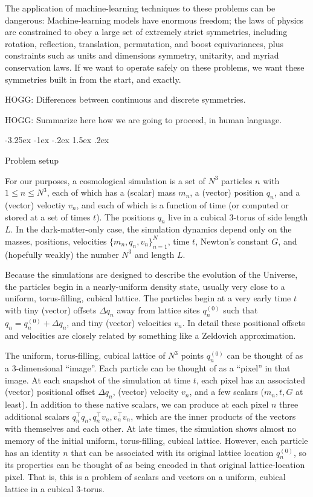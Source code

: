 \documentclass{article}
\makeatletter
\theoremstyle{plain}
\renewcommand\section{\@startsection {section}{1}{\z@}%
  {-3.25ex \@plus -1ex \@minus -.2ex}%
  {1.5ex \@plus .2ex}%
  {\raggedright\normalfont\large\bfseries}}
\makeatother
\begin{document}
The application of machine-learning techniques to these problems can be dangerous:
Machine-learning models have enormous freedom; the laws of physics are constrained to obey a large set of extremely strict symmetries, including rotation, reflection, translation, permutation, and boost equivariances, plus constraints such as units and dimensions symmetry, unitarity, and myriad conservation laws.
If we want to operate safely on these problems, we want these symmetries built in from the start, and exactly.

HOGG: Differences between continuous and discrete symmetries.

HOGG: Summarize here how we are going to proceed, in human language.

\section{Problem setup}\label{sec:setup}

For our purposes, a cosmological simulation is a set of $N^3$ particles $n$ with $1\leq n\leq N^3$, each of which has a (scalar) mass $m_n$, a (vector) position $q_n$, and a (vector) veloctiy $v_n$, and each of which is a function of time (or computed or stored at a set of times $t$).
The positions $q_n$ live in a cubical 3-torus of side length $L$.
In the dark-matter-only case, the simulation dynamics depend only on the masses, positions, velocities $\{m_n, q_n, v_n\}_{n=1}^N$, time $t$, Newton's constant $G$, and (hopefully weakly) the number $N^3$ and length $L$.

Because the simulations are designed to describe the evolution of the Universe, the particles begin in a nearly-uniform density state, usually very close to a uniform, torus-filling, cubical lattice.
The particles begin at a very early time $t$ with tiny (vector) offsets $\Delta q_n$ away from lattice sites $q^{(0)}_n$ such that $q_n = q^{(0)}_n + \Delta q_n$, and tiny (vector) velocities $v_n$.
In detail these positional offsets and velocities are closely related by something like a Zeldovich approximation.

The uniform, torus-filling, cubical lattice of $N^3$ points $q^{(0)}_n$ can be thought of as a 3-dimensional ``image''.
Each particle can be thought of as a ``pixel'' in that image.
At each snapshot of the simulation at time $t$, each pixel has an associated (vector) positional offset $\Delta q_n$, (vector) velocity $v_n$, and a few scalars ($m_n, t, G$ at least).
In addition to these native scalars, we can produce at each pixel $n$ three additional scalars $q_n^\top q_n, q_n^\top v_n, v_n^\top v_n$, which are the inner products of the vectors with themselves and each other.
At late times, the simulation shows almost no memory of the initial uniform, torus-filling, cubical lattice.
However, each particle has an identity $n$ that can be associated with its original lattice location $q^{(0)}_n$, so its properties can be thought of as being encoded in that original lattice-location pixel.
That is, this is a problem of scalars and vectors on a uniform, cubical lattice in a cubical 3-torus.
\end{document}
